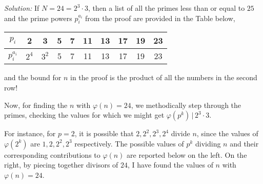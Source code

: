 \documentclass{report}
\theoremstyle{plain}
\begin{document}
\begin{enumerate}
\emph{Solution:} If $N = 24 = 2^3 \cdot 3$, then a list of all the primes less than or equal to $25$ and the prime powers
$p_i^{a_i}$ from the proof are provided in the Table below,

\begin{center}
\begin{tabular}{c || ccccccccc}
$p_i$ & 2 & 3 & 5 & 7 & 11 & 13 & 17 & 19 & 23\\
\hline
$p_i^{a_i}$ & $2^4$ & $3^2$ & 5  & 7 & 11 & 13 & 17 & 19 & 23\\
\end{tabular}
\end{center}

and the bound for $n$ in the proof is the product of all the numbers in the second row!

Now, for finding the $n$ with $\varphi(n) = 24$, we methodically step through the primes, checking the values for which
we might get $\varphi(p^k) \, \vert \, 2^3 \cdot 3$.

For instance, for $p=2$, it is possible that $2, 2^2, 2^3, 2^4$ divide $n$, since the values of $\varphi(2^k)$ are
$1, 2, 2^2, 2^3$ respectively.    The possible values of $p^k$ dividing $n$ and their corresponding contributions
to $\varphi(n)$ are reported below on the left.  On the right, by piecing together divisors of $24$, I have found   
the values of $n$ with $\varphi(n) = 24$.

\end{enumerate}

\bigskip
\end{document}
